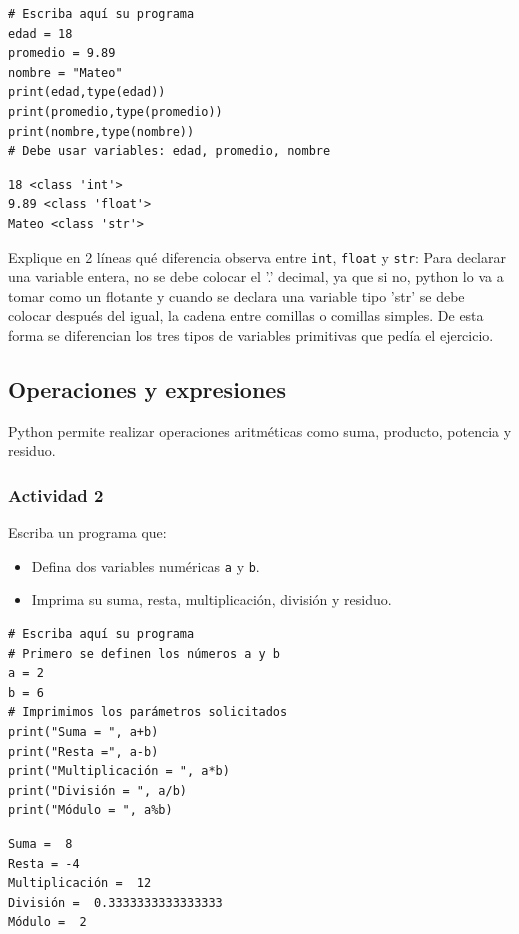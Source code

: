 \documentclass{article}
\begin{document}
\begin{verbatim}
# Escriba aquí su programa
edad = 18
promedio = 9.89
nombre = "Mateo"
print(edad,type(edad))
print(promedio,type(promedio))
print(nombre,type(nombre))
# Debe usar variables: edad, promedio, nombre
\end{verbatim}

\begin{verbatim}
18 <class 'int'>
9.89 <class 'float'>
Mateo <class 'str'>
\end{verbatim}


Explique en 2 líneas qué diferencia observa entre \texttt{int}, \texttt{float} y
\texttt{str}:
Para declarar una variable entera, no se debe colocar el '.' decimal,
ya que si no, python lo va a tomar como un flotante y cuando se
declara una variable tipo 'str' se debe colocar después del igual, la
cadena entre comillas o comillas simples. De esta forma se diferencian
los tres tipos de variables primitivas que pedía el ejercicio.

\subsection{Operaciones y expresiones}
\label{sec:org36c0f8b}
Python permite realizar operaciones aritméticas como suma, producto, potencia y residuo.

\subsubsection{Actividad 2}
\label{sec:orgb47a726}
Escriba un programa que:
\begin{itemize}
\item Defina dos variables numéricas \texttt{a} y \texttt{b}.
\item Imprima su suma, resta, multiplicación, división y residuo.
\end{itemize}

\begin{verbatim}
# Escriba aquí su programa
# Primero se definen los números a y b
a = 2
b = 6
# Imprimimos los parámetros solicitados
print("Suma = ", a+b)
print("Resta =", a-b)
print("Multiplicación = ", a*b)
print("División = ", a/b)
print("Módulo = ", a%b)
\end{verbatim}

\begin{verbatim}
Suma =  8
Resta = -4
Multiplicación =  12
División =  0.3333333333333333
Módulo =  2
\end{verbatim}
\end{document}
